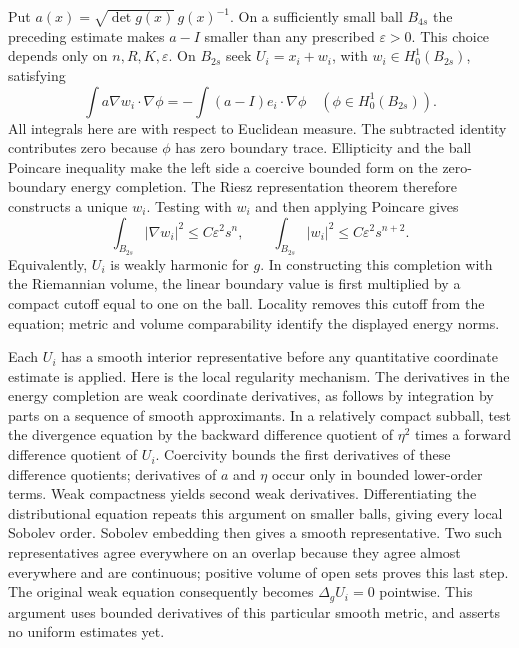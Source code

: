 Put $a(x)=\sqrt{\det g(x)}\,g(x)^{-1}$.  On a sufficiently
small ball $B_{4s}$ the preceding estimate makes $a-I$ smaller
than any prescribed $\varepsilon>0$.  This choice depends only
on $n,R,K,\varepsilon$.  On $B_{2s}$ seek
$U_i=x_i+w_i$, with $w_i\in H^1_0(B_{2s})$, satisfying
\begin{equation}\label{eq:rf-harmonic-replacement}
 \int a\nabla w_i\cdot\nabla\phi
   =-\int(a-I)e_i\cdot\nabla\phi
       \quad(\phi\in H^1_0(B_{2s})).
\end{equation}
All integrals here are with respect to Euclidean measure.  The
subtracted identity contributes zero because $\phi$ has zero
boundary trace.  Ellipticity and the ball Poincare inequality
make the left side a coercive bounded form on the zero-boundary
energy completion.  The Riesz representation theorem therefore
constructs a unique $w_i$.  Testing with $w_i$ and then applying
Poincare gives
\begin{equation}\label{eq:rf-correction-energy}
 \int_{B_{2s}}|\nabla w_i|^2\leq C\varepsilon^2s^n,
 \qquad \int_{B_{2s}}|w_i|^2\leq C\varepsilon^2s^{n+2}.
\end{equation}
Equivalently, $U_i$ is weakly harmonic for $g$.  In constructing
this completion with the Riemannian volume, the linear boundary
value is first multiplied by a compact cutoff equal to one on
the ball.  Locality removes this cutoff from the equation; metric
and volume comparability identify the displayed energy norms.

Each $U_i$ has a smooth interior representative before any
quantitative coordinate estimate is applied.  Here is the local
regularity mechanism.  The derivatives in the energy completion
are weak coordinate derivatives, as follows by integration by
parts on a sequence of smooth approximants.  In a relatively
compact subball, test the divergence equation by the backward
difference quotient of $\eta^2$ times a forward difference
quotient of $U_i$.  Coercivity bounds the first derivatives of
these difference quotients; derivatives of $a$ and $\eta$ occur
only in bounded lower-order terms.  Weak compactness yields
second weak derivatives.  Differentiating the distributional
equation repeats this argument on smaller balls, giving every
local Sobolev order.  Sobolev embedding then gives a smooth
representative.  Two such representatives agree everywhere on
an overlap because they agree almost everywhere and are
continuous; positive volume of open sets proves this last step.
The original weak equation consequently becomes $\Delta_gU_i=0$
pointwise.  This argument uses bounded derivatives of this
particular smooth metric, and asserts no uniform estimates yet.

